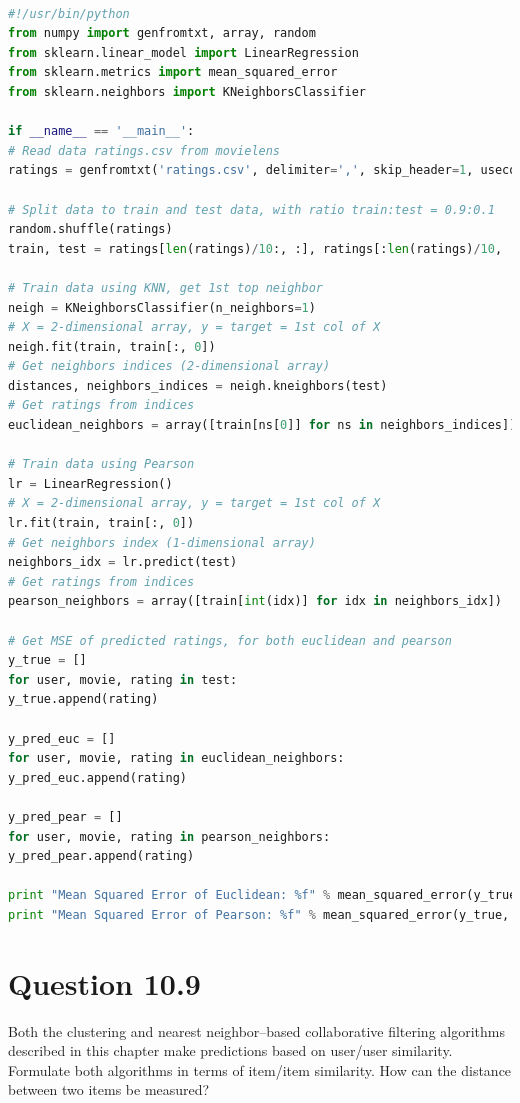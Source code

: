 \documentclass[letterpaper,11pt]{article}
\begin{document}
\begin{lstlisting}[language=python, caption={Code for nearest neighbor–based collaborative filtering algorithm }, label={lst:10_8}]

#!/usr/bin/python
from numpy import genfromtxt, array, random
from sklearn.linear_model import LinearRegression
from sklearn.metrics import mean_squared_error
from sklearn.neighbors import KNeighborsClassifier

if __name__ == '__main__':
# Read data ratings.csv from movielens
ratings = genfromtxt('ratings.csv', delimiter=',', skip_header=1, usecols=range(3))

# Split data to train and test data, with ratio train:test = 0.9:0.1
random.shuffle(ratings)
train, test = ratings[len(ratings)/10:, :], ratings[:len(ratings)/10, :]

# Train data using KNN, get 1st top neighbor
neigh = KNeighborsClassifier(n_neighbors=1)
# X = 2-dimensional array, y = target = 1st col of X
neigh.fit(train, train[:, 0])
# Get neighbors indices (2-dimensional array)
distances, neighbors_indices = neigh.kneighbors(test)
# Get ratings from indices
euclidean_neighbors = array([train[ns[0]] for ns in neighbors_indices])

# Train data using Pearson
lr = LinearRegression()
# X = 2-dimensional array, y = target = 1st col of X
lr.fit(train, train[:, 0])
# Get neighbors index (1-dimensional array)
neighbors_idx = lr.predict(test)
# Get ratings from indices
pearson_neighbors = array([train[int(idx)] for idx in neighbors_idx])

# Get MSE of predicted ratings, for both euclidean and pearson
y_true = []
for user, movie, rating in test:
y_true.append(rating)

y_pred_euc = []
for user, movie, rating in euclidean_neighbors:
y_pred_euc.append(rating)

y_pred_pear = []
for user, movie, rating in pearson_neighbors:
y_pred_pear.append(rating)

print "Mean Squared Error of Euclidean: %f" % mean_squared_error(y_true, y_pred_euc)
print "Mean Squared Error of Pearson: %f" % mean_squared_error(y_true, y_pred_pear)


\end{lstlisting}

\noindent\makebox[\linewidth]{\rule{\textwidth}{0.4pt}}

\section*{Question 10.9}
\begin{spverbatim}
Both the clustering and nearest neighbor–based collaborative filtering algorithms described in this chapter make predictions based on user/user similarity. Formulate both algorithms in terms of item/item similarity. How can the distance between two items be measured?
\end{spverbatim}
\end{document}
